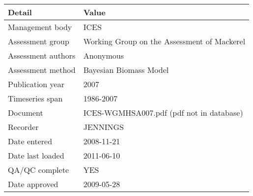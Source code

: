 \begin{table}[htb]
\centering
\begin{tabular}{lp{7cm}}
\toprule
Detail & Value \\
\midrule
Management body    & ICES                                        \\
Assessment group   & Working Group on the Assessment of Mackerel \\
Assessment authors & Anonymous                                   \\
Assessment method  & Bayesian Biomass Model                      \\
Publication year   & 2007                                        \\
Timeseries span    & 1986-2007                                   \\
Document           & ICES-WGMHSA007.pdf (pdf not in database)    \\
Recorder           & JENNINGS                                    \\
Date entered       & 2008-11-21                                  \\
Date last loaded   & 2011-06-10                                  \\
QA/QC complete     & YES                                         \\
Date approved      & 2009-05-28                                  \\
\bottomrule
\end{tabular}
\label{tab:assessdet}
\end{table}
